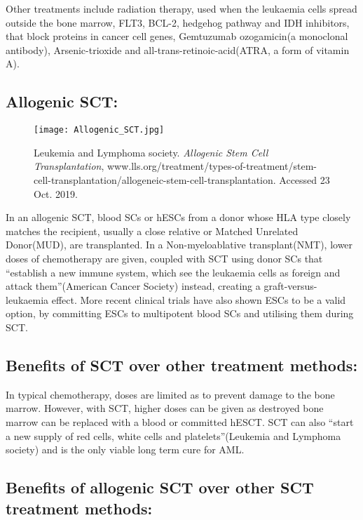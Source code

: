 \documentclass[11pt, a4]{article}
\begin{document}
			\bigbreak
				
			Other treatments include radiation therapy, used when the leukaemia cells spread outside the bone marrow, FLT3, BCL-2, hedgehog pathway and IDH inhibitors, that block proteins in cancer cell genes, Gemtuzumab ozogamicin(a monoclonal antibody), Arsenic-trioxide and all-trans-retinoic-acid(ATRA, a form of vitamin A).
				
			\subsection{Allogenic SCT:}
			
				\begin{wrapfigure}{r}{4 cm}
					\centering
					\texttt{[image: Allogenic\_SCT.jpg]}
					\caption{\scriptsize Leukemia and Lymphoma society. \textit{Allogenic Stem Cell Transplantation}, www.lls.org/treatment/types-of-treatment/stem-cell-transplantation/allogeneic-stem-cell-transplantation. Accessed 23 Oct. 2019.}
					\vspace{-50pt}
				\end{wrapfigure}
				
				In an allogenic SCT, blood SCs or hESCs from a donor whose HLA type closely matches the recipient, usually a close relative or Matched Unrelated Donor(MUD), are transplanted. In a Non-myeloablative transplant(NMT), lower doses of chemotherapy are given, coupled with SCT using donor SCs that ``establish a new immune system, which see the leukaemia cells as foreign and attack them''(American Cancer Society) instead, creating a graft-versus-leukaemia effect. More recent clinical trials have also shown ESCs to be a valid option, by committing ESCs to multipotent blood SCs and utilising them during SCT.
				
				
			\subsection{Benefits of SCT over other treatment methods:}
				In typical chemotherapy, doses are limited as to prevent damage to the bone marrow. However, with SCT, higher doses can be given as destroyed bone marrow can be replaced with a blood or committed hESCT. SCT can also ``start a new supply of red cells, white cells and platelets''(Leukemia and Lymphoma society) and is the only viable long term cure for AML.			
			
			\subsection{Benefits of allogenic SCT over other SCT treatment methods:}
				
\end{document}
